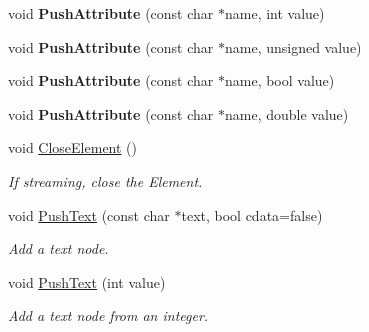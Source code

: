 \begin{DoxyCompactItemize}
void {\bfseries Push\+Attribute} (const char $\ast$name, int value)
\item 
\mbox{\label{classtinyxml2_1_1XMLPrinter_aa41039e51990aaf5342f3e0575a692c4}} 
void {\bfseries Push\+Attribute} (const char $\ast$name, unsigned value)
\item 
\mbox{\label{classtinyxml2_1_1XMLPrinter_a51f7950d7b7a19f0d3a0d549a318d45f}} 
void {\bfseries Push\+Attribute} (const char $\ast$name, bool value)
\item 
\mbox{\label{classtinyxml2_1_1XMLPrinter_a1714867af40e68ca404c3e84b6cac2a6}} 
void {\bfseries Push\+Attribute} (const char $\ast$name, double value)
\item 
\mbox{\label{classtinyxml2_1_1XMLPrinter_aed6cce4bd414a78b3e2a824803c3ec42}} 
void \hyperlink{classtinyxml2_1_1XMLPrinter_aed6cce4bd414a78b3e2a824803c3ec42}{Close\+Element} ()
\begin{DoxyCompactList}\small\item\em If streaming, close the Element. \end{DoxyCompactList}\item 
\mbox{\label{classtinyxml2_1_1XMLPrinter_a1cc16a9362df4332012cb13cff6441b3}} 
void \hyperlink{classtinyxml2_1_1XMLPrinter_a1cc16a9362df4332012cb13cff6441b3}{Push\+Text} (const char $\ast$text, bool cdata=false)
\begin{DoxyCompactList}\small\item\em Add a text node. \end{DoxyCompactList}\item 
\mbox{\label{classtinyxml2_1_1XMLPrinter_a3e0d4d78de25d4cf081009e1431cea7e}} 
void \hyperlink{classtinyxml2_1_1XMLPrinter_a3e0d4d78de25d4cf081009e1431cea7e}{Push\+Text} (int value)
\begin{DoxyCompactList}\small\item\em Add a text node from an integer. \end{DoxyCompactList}\item 
\mbox{\label{classtinyxml2_1_1XMLPrinter_a661fb50e7e0a4918d2d259cb0fae647e}} 

\end{DoxyCompactItemize}
